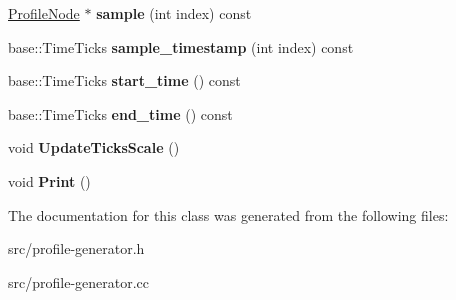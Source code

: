\begin{DoxyCompactItemize}
\item 
\hypertarget{classv8_1_1internal_1_1_cpu_profile_a82ca9b7c41faa9bec21e5d200c7eb19b}{}\hyperlink{classv8_1_1internal_1_1_profile_node}{Profile\+Node} $\ast$ {\bfseries sample} (int index) const \label{classv8_1_1internal_1_1_cpu_profile_a82ca9b7c41faa9bec21e5d200c7eb19b}

\item 
\hypertarget{classv8_1_1internal_1_1_cpu_profile_a5401725d0db6602b03ffd4201aec25e7}{}base\+::\+Time\+Ticks {\bfseries sample\+\_\+timestamp} (int index) const \label{classv8_1_1internal_1_1_cpu_profile_a5401725d0db6602b03ffd4201aec25e7}

\item 
\hypertarget{classv8_1_1internal_1_1_cpu_profile_a0dceabcb534acd77df948f741dfaae2f}{}base\+::\+Time\+Ticks {\bfseries start\+\_\+time} () const \label{classv8_1_1internal_1_1_cpu_profile_a0dceabcb534acd77df948f741dfaae2f}

\item 
\hypertarget{classv8_1_1internal_1_1_cpu_profile_ac39a426d7cd0308d018e8264ac3cb403}{}base\+::\+Time\+Ticks {\bfseries end\+\_\+time} () const \label{classv8_1_1internal_1_1_cpu_profile_ac39a426d7cd0308d018e8264ac3cb403}

\item 
\hypertarget{classv8_1_1internal_1_1_cpu_profile_a66f5b3ad5fe0fcf040e8274e5238441d}{}void {\bfseries Update\+Ticks\+Scale} ()\label{classv8_1_1internal_1_1_cpu_profile_a66f5b3ad5fe0fcf040e8274e5238441d}

\item 
\hypertarget{classv8_1_1internal_1_1_cpu_profile_a5dc2db626ffd25bf1db98cc0aa9ca906}{}void {\bfseries Print} ()\label{classv8_1_1internal_1_1_cpu_profile_a5dc2db626ffd25bf1db98cc0aa9ca906}

\end{DoxyCompactItemize}


The documentation for this class was generated from the following files\+:\begin{DoxyCompactItemize}
\item 
src/profile-\/generator.\+h\item 
src/profile-\/generator.\+cc\end{DoxyCompactItemize}
